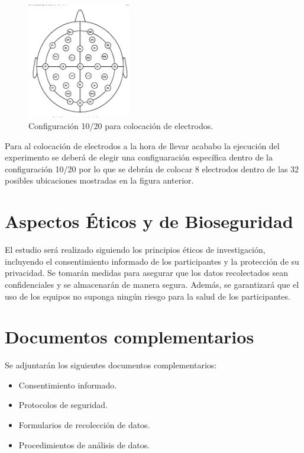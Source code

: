 \documentclass[12pt]{article}
\begin{document}
\begin{figure}[h!]
    \centering
    \includegraphics[width=0.4\textwidth]{recursos_img/configuracion_diagrama_10_20.png}  %
    \caption{Configuración 10/20 para colocación de electrodos.}
    \label{fig:mi_imagen}  %
\end{figure}
Para al colocación de electrodos a la hora de llevar acababo la ejecución del 
experimento se deberá de elegir una configuaración específica dentro de  la 
configuración 10/20 por lo que se debrán de colocar 8 electrodos dentro de las 32 
posibles ubicaciones mostradas en la figura anterior.

\section{Aspectos Éticos y de Bioseguridad}
El estudio será realizado siguiendo los principios éticos de investigación, 
incluyendo el consentimiento informado de los participantes y la protección de su 
privacidad. Se tomarán medidas para asegurar que los datos recolectados sean 
confidenciales y se almacenarán de manera segura. Además, se garantizará que el 
uso de los equipos no suponga ningún riesgo para la salud de los participantes.

\section{Documentos complementarios}
Se adjuntarán los siguientes documentos complementarios:
\begin{itemize}
    \item Consentimiento informado.
    \item Protocolos de seguridad.
    \item Formularios de recolección de datos.
    \item Procedimientos de análisis de datos.
\end{itemize}
\end{document}

